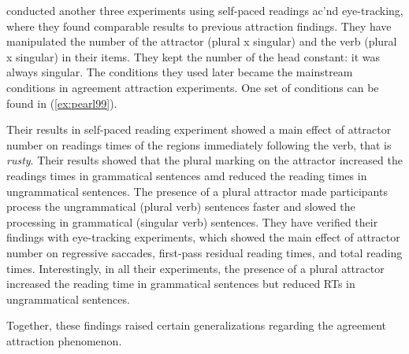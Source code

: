  conducted another three experiments using self-paced readings ac'nd eye-tracking, where they found comparable results to previous attraction findings. They have manipulated the number of the attractor (plural x singular) and the verb (plural x singular) in their items. They kept the number of the head constant: it was always singular. The conditions they used later became the mainstream conditions in agreement attraction experiments. One set of conditions can be found in (\ref{ex:pearl99}).

\ea \label{ex:pearl99}
  \z
\z

Their results in self-paced reading experiment showed a main effect of attractor number on readings times of the regions immediately following the verb, that is \emph{rusty}. Their results showed that the plural marking on the attractor increased the readings times in grammatical sentences amd reduced the reading times in ungrammatical sentences. The presence of a plural attractor made participants process the ungrammatical (plural verb) sentences faster and slowed the processing in grammatical (singular verb) sentences.  They have verified their findings with eye-tracking experiments, which showed the main effect of attractor number on regressive saccades, first-pass residual reading times, and total reading times. Interestingly, in all their experiments, the presence of a plural attractor increased the reading time in grammatical sentences but reduced RTs in ungrammatical sentences. 

Together, these findings raised certain generalizations regarding the agreement attraction phenomenon. 

